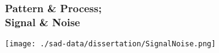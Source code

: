 \documentclass[14pt]{beamer}
\begin{document}

\begin{frame}
\frametitle{Pattern \& Process;\\ Signal \& Noise}
\begin{center}
\texttt{[image: ./sad-data/dissertation/SignalNoise.png]}
\end{center}
\end{frame}

\end{document}
